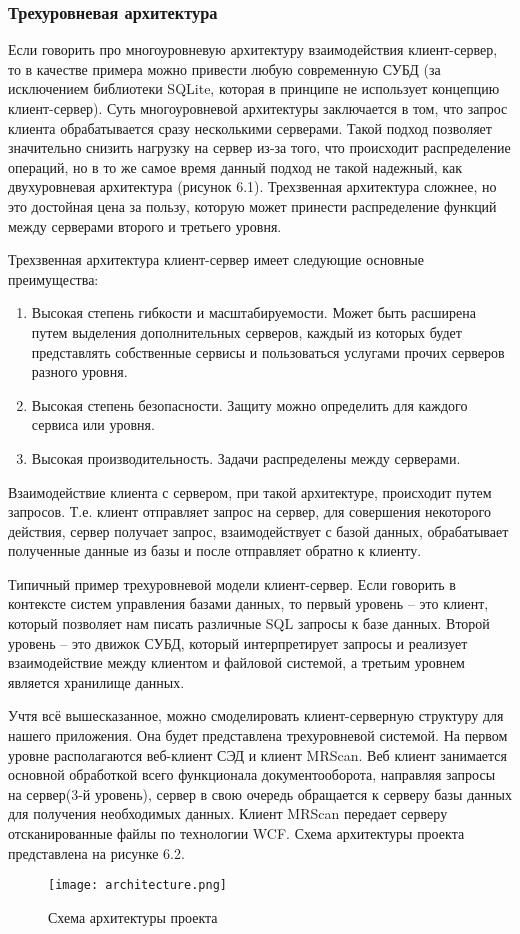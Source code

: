 \subsubsection{Трехуровневая архитектура}

Если говорить про многоуровневую архитектуру взаимодействия клиент-сервер, то в качестве примера можно привести любую современную СУБД (за исключением библиотеки SQLite, которая в принципе не использует концепцию клиент-сервер). Суть многоуровневой архитектуры заключается в том, что запрос клиента обрабатывается сразу несколькими серверами. Такой подход позволяет значительно снизить нагрузку на сервер из-за того, что происходит распределение операций, но в то же самое время данный подход не такой надежный, как двухуровневая архитектура (рисунок 6.1). Трехзвенная архитектура сложнее, но это достойная цена за пользу, которую может принести распределение функций между серверами второго и третьего уровня.

Трехзвенная архитектура клиент-сервер имеет следующие основные преимущества:
\begin{enumerate}
	\item Высокая степень гибкости и масштабируемости. Может быть расширена путем выделения дополнительных серверов, каждый из которых будет представлять собственные сервисы и пользоваться услугами прочих серверов разного уровня.
	\item Высокая степень безопасности. Защиту можно определить для каждого сервиса или уровня.
	\item Высокая производительность. Задачи распределены между серверами.
\end{enumerate}

Взаимодействие клиента с сервером, при такой архитектуре, происходит путем запросов. Т.е. клиент отправляет запрос на сервер, для совершения некоторого действия, сервер получает запрос, взаимодействует с базой данных, обрабатывает полученные данные из базы и после отправляет обратно к клиенту.

Типичный пример трехуровневой модели клиент-сервер. Если говорить в контексте систем управления базами данных, то первый уровень – это клиент, который позволяет нам писать различные SQL запросы к базе данных. Второй уровень – это движок СУБД, который интерпретирует запросы и реализует взаимодействие между клиентом и файловой системой, а третьим уровнем является хранилище данных.

Учтя всё вышесказанное, можно смоделировать клиент-серверную структуру для нашего приложения. Она будет представлена трехуровневой системой. На первом уровне располагаются веб-клиент СЭД и клиент MRScan. Веб клиент занимается основной обработкой всего функционала документооборота, направляя запросы на сервер(3-й уровень), сервер в свою очередь обращается к серверу базы данных для получения необходимых данных. Клиент MRScan передает серверу отсканированные файлы по технологии WCF. Схема архитектуры проекта представлена на рисунке 6.2.

\begin{figure}[h!]
	\centering
	\texttt{[image: architecture.png]}
	\caption{Схема архитектуры проекта}
	\clearpage
\end{figure}